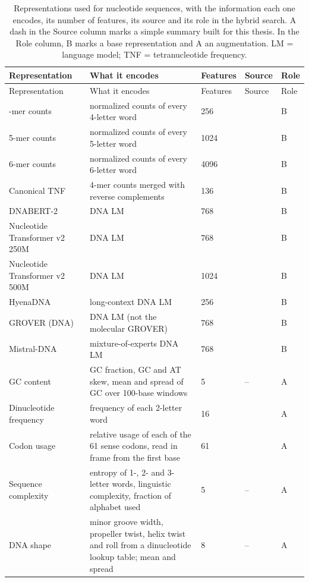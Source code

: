 \begin{longtable}{P{3.0cm}P{5.0cm}P{1.5cm}P{1.5cm}P{1.4cm}}
\caption[Representations used for nucleotide sequences.]{Representations used for nucleotide sequences, with the information each one encodes, its number of features, its source and its role in the hybrid search. A dash in the Source column marks a simple summary built for this thesis. In the Role column, B marks a base representation and A an augmentation. LM = language model; TNF = tetranucleotide frequency.}\label{tab:reps_nucleotides}\\
\toprule
Representation & What it encodes & Features & Source & Role \\
\midrule
\endfirsthead
\toprule
Representation & What it encodes & Features & Source & Role \\
\midrule
\endhead
\bottomrule
{}-mer counts & normalized counts of every 4-letter word & 256 & \citep{Vinga2003} & B \\
5-mer counts & normalized counts of every 5-letter word & 1024 & \citep{Vinga2003} & B \\
6-mer counts & normalized counts of every 6-letter word & 4096 & \citep{Vinga2003} & B \\
Canonical TNF & 4-mer counts merged with reverse complements & 136 & \citep{Teeling2004} & B \\
DNABERT-2 & DNA LM & 768 & \citep{Zhou2023DNABERT2} & B \\
Nucleotide Transformer v2 250M & DNA LM & 768 & \citep{DallaTorre2025} & B \\
Nucleotide Transformer v2 500M & DNA LM & 1024 & \citep{DallaTorre2025} & B \\
HyenaDNA & long-context DNA LM & 256 & \citep{Nguyen2023HyenaDNA} & B \\
GROVER (DNA) & DNA LM (not the molecular GROVER) & 768 & \citep{Sanabria2024} & B \\
Mistral-DNA & mixture-of-experts DNA LM & 768 & \citep{Mourad2024} & B \\
GC content & GC fraction, GC and AT skew, mean and spread of GC over 100-base windows & 5 & -- & A \\
Dinucleotide frequency & frequency of each 2-letter word & 16 & \citep{Vinga2003} & A \\
Codon usage & relative usage of each of the 61 sense codons, read in frame from the first base & 61 & \citep{Sharp1986} & A \\
Sequence complexity & entropy of 1-, 2- and 3-letter words, linguistic complexity, fraction of alphabet used & 5 & -- & A \\
DNA shape & minor groove width, propeller twist, helix twist and roll from a dinucleotide lookup table; mean and spread & 8 & -- & A \\
\end{longtable}

